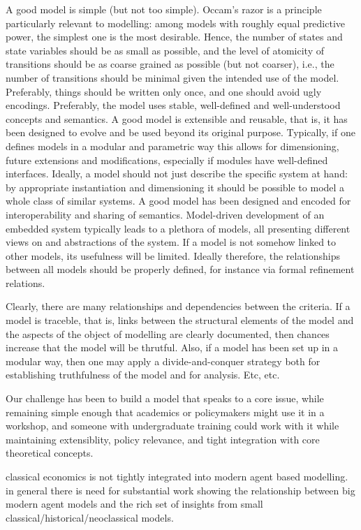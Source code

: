     A good model is simple (but not too simple). Occam's razor is a principle particularly relevant to modelling: among models with roughly equal predictive power, the simplest one is the most desirable. Hence, the number of states and state variables should be as small as possible, and the level of atomicity of transitions should be as coarse grained as possible (but not coarser), i.e., the number of transitions should be minimal given the intended use of the model. Preferably, things should be written only once, and one should avoid ugly encodings. Preferably, the model uses stable, well-defined and well-understood concepts and semantics.
    A good model is extensible and reusable, that is, it has been designed to evolve and be used beyond its original purpose. Typically, if one defines models in a modular and parametric way this allows for dimensioning, future extensions and modifications, especially if modules have well-defined interfaces. Ideally, a model should not just describe the specific system at hand: by appropriate instantiation and dimensioning it should be possible to model a whole class of similar systems.
    A good model has been designed and encoded for interoperability and sharing of semantics. Model-driven development of an embedded system typically leads to a plethora of models, all presenting different views on and abstractions of the system. If a model is not somehow linked to other models, its usefulness will be limited. Ideally therefore, the relationships between all models should be properly defined, for instance via formal refinement relations. 

Clearly, there are many relationships and dependencies between the criteria. If a model is traceble, that is, links between the structural elements of the model and the aspects of the object of modelling are clearly documented, then chances increase that the model will be thrutful. Also, if a model has been set up in a modular way, then one may apply a divide-and-conquer strategy both for establishing truthfulness of the model and for analysis. Etc, etc.


Our challenge has been to build a model that speaks to a core issue, while remaining simple enough that academics or policymakers might use it in a workshop, and someone with undergraduate training could work with it while maintaining extensiblity, policy relevance, and tight integration with core theoretical concepts. %


classical economics is not tightly integrated into modern agent based modelling.
in general there is need for substantial work showing the relationship between big modern agent models and the rich set of insights from small classical/historical/neoclassical models.

